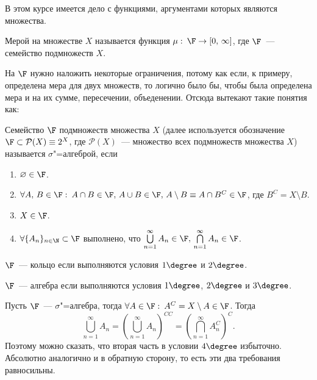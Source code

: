 \newpage
{}

В этом курсе имеется дело с функциями, аргументами которых являются множества.
\begin{definition}
	Мерой на множестве $X$ называется функция
	$\mu:\: \F \rightarrow [0,\, \infty]$, где $\F$~--- семейство подмножеств $X$.
\end{definition}

На $\F$ нужно наложить некоторые ограничения, потому как если, к примеру, определена мера для двух множеств,
то логично было бы, чтобы была определена мера и на их сумме, пересечении, объеденении. Отсюда вытекают такие понятия как:

\begin{definition}
	Семейство $\F$ подмножеств множества $X$ (далее используется обозначение $\F \subset \mathcal{P} (X)\equiv 2^{X}$, где
	$\mathcal{P} (X)$~--- множество всех подмножеств множества $X$) называется $\sigma$"=алгеброй, если
	\begin{enumerate}[label=\arabic*\degree.]
		\item $\varnothing\in \F$.
		\item $\forall A,\, B\in\F:\: A\cap B\in\F,\,A\cup B\in\F,\, A\setminus B\equiv A\cap B^C\in\F$, где
		      $B^C=X\setminus B$.
		\item $X\in\F$.
		\item $\forall \{A_n\}_{n\in\N}\subset\F$ выполнено, что
		      $\bigcup\limits_{n=1}^{\infty}A_n\in\F,\,\bigcap\limits_{n=1}^{\infty}A_n\in\F$.
	\end{enumerate}
\end{definition}

\begin{definition}
	$\F$~--- кольцо если выполняются условия $1\degree$ и $2\degree$.
\end{definition}
\begin{definition}
	$\F$~--- алгебра если выполняются условия $1\degree$, $2\degree$ и $3\degree$.
\end{definition}

\begin{remark}
	Пусть $\F$~--- $\sigma$"=алгебра, тогда $\forall A\in\F:\: A^C=X\setminus A\in\F$. Тогда
	\[
		\bigcup\limits_{n=1}^{\infty}A_n=\left(\bigcup\limits_{n=1}^{\infty}A_n\right)^{CC}=
		\left(\bigcap\limits_{n=1}^{\infty}A_n^C\right)^C.
	\]
	Поэтому можно сказать, что вторая часть в условии $4\degree$ избыточно. Абсолютно аналогично и в обратную сторону,
	то есть эти два требования равносильны.
\end{remark}

